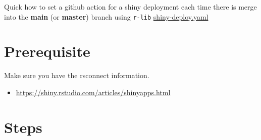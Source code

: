 \documentclass[
]{book}
\providecommand{\tightlist}{%
  \setlength{\itemsep}{0pt}\setlength{\parskip}{0pt}}
\begin{document}
Quick how to set a github action for a shiny deployment each time there is merge into the \textbf{main} (or \textbf{master}) branch using \texttt{r-lib} \href{https://github.com/r-lib/actions/blob/v2-branch/examples/shiny-deploy.yaml}{shiny-deploy.yaml}

\hypertarget{prerequisite-1}{%
\section{Prerequisite}\label{prerequisite-1}}

Make sure you have the rsconnect information.

\begin{itemize}
\tightlist
\item
  \url{https://shiny.rstudio.com/articles/shinyapps.html}
\end{itemize}

\hypertarget{steps-1}{%
\section{Steps}\label{steps-1}}
\end{document}
